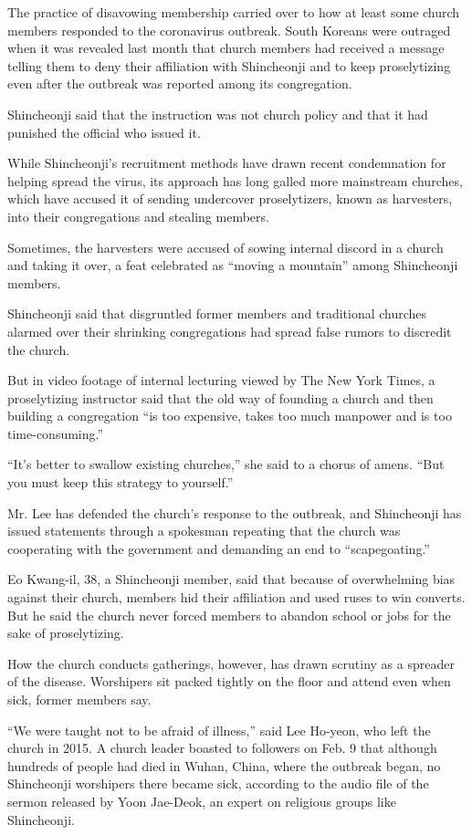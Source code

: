 The practice of disavowing membership carried over to how at least some
church members responded to the coronavirus outbreak. South Koreans were
outraged when it was revealed last month that church members had
received a message telling them to deny their affiliation with
Shincheonji and to keep proselytizing even after the outbreak was
reported among its congregation.

Shincheonji said that the instruction was not church policy and that it
had punished the official who issued it.

While Shincheonji's recruitment methods have drawn recent condemnation
for helping spread the virus, its approach has long galled more
mainstream churches, which have accused it of sending undercover
proselytizers, known as harvesters, into their congregations and
stealing members.

Sometimes, the harvesters were accused of sowing internal discord in a
church and taking it over, a feat celebrated as ``moving a mountain''
among Shincheonji members.

Shincheonji said that disgruntled former members and traditional
churches alarmed over their shrinking congregations had spread false
rumors to discredit the church.

But in video footage of internal lecturing viewed by The New York Times,
a proselytizing instructor said that the old way of founding a church
and then building a congregation ``is too expensive, takes too much
manpower and is too time-consuming.''

``It's better to swallow existing churches,'' she said to a chorus of
amens. ``But you must keep this strategy to yourself.''

Mr. Lee has defended the church's response to the outbreak, and
Shincheonji has issued statements through a spokesman repeating that the
church was cooperating with the government and demanding an end to
``scapegoating.''

Eo Kwang-il, 38, a Shincheonji member, said that because of overwhelming
bias against their church, members hid their affiliation and used ruses
to win converts. But he said the church never forced members to abandon
school or jobs for the sake of proselytizing.

How the church conducts gatherings, however, has drawn scrutiny as a
spreader of the disease. Worshipers sit packed tightly on the floor and
attend even when sick, former members say.

``We were taught not to be afraid of illness,'' said Lee Ho-yeon, who
left the church in 2015. A church leader boasted to followers on Feb. 9
that although hundreds of people had died in Wuhan, China, where the
outbreak began, no Shincheonji worshipers there became sick, according
to the audio file of the sermon released by Yoon Jae-Deok, an expert on
religious groups like Shincheonji.

